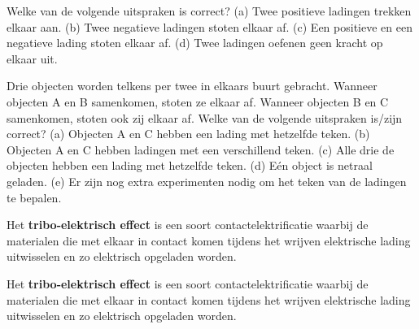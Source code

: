 \begin{quiz}\label{q:aantrekken of afstoten}
	Welke van de volgende uitspraken is correct? (a) Twee positieve ladingen trekken elkaar aan. (b) Twee negatieve ladingen stoten elkaar af. (c) Een positieve en een negatieve lading stoten elkaar af. (d) Twee ladingen oefenen geen kracht op elkaar uit.
\end{quiz}
\vspace{2mm}
\begin{quiz}\label{q:eigenschappen ladingen} 
Drie objecten worden telkens per twee in elkaars buurt gebracht. Wanneer objecten A en B samenkomen, stoten ze elkaar af. Wanneer objecten B en C samenkomen, stoten ook zij elkaar af. Welke van de volgende uitspraken is/zijn correct? (a) Objecten A en C hebben een lading met hetzelfde teken. (b) Objecten A en C hebben ladingen met een verschillend teken. (c) Alle drie de objecten hebben een lading met hetzelfde teken. (d) Eén object is netraal geladen. (e) Er zijn nog extra experimenten nodig om het teken van de ladingen te bepalen.
\end{quiz}

\begin{definitie}
	Het \textbf{tribo-elektrisch effect} is een soort contactelektrificatie waarbij de materialen die met elkaar in contact komen tijdens het wrijven elektrische lading uitwisselen en zo elektrisch opgeladen worden.
\end{definitie}
\begin{definition}
	Het \textbf{tribo-elektrisch effect} is een soort contactelektrificatie waarbij de materialen die met elkaar in contact komen tijdens het wrijven elektrische lading uitwisselen en zo elektrisch opgeladen worden.
\end{definition}

